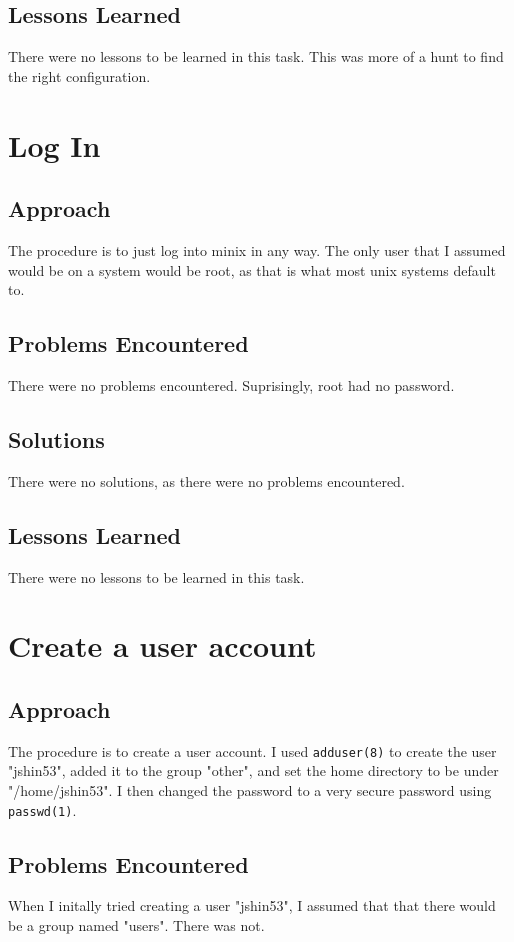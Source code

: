 \documentclass[11pt]{article}
\begin{document}
\subsection{Lessons Learned}
There were no lessons to be learned in this task. This was more of a hunt to find the right configuration.

\section{Log In}
\subsection{Approach}
The procedure is to just log into minix in any way. The only user that I assumed would be on a system would be root, as that is what most unix systems default to.

\subsection{Problems Encountered}
There were no problems encountered. Suprisingly, root had no password.

\subsection{Solutions}
There were no solutions, as there were no problems encountered.

\subsection{Lessons Learned}
There were no lessons to be learned in this task.

\section{Create a user account}
\subsection{Approach}
The procedure is to create a user account. I used {\tt adduser(8)} to create the user "jshin53", added it to the group "other", and set the home directory to be under "/home/jshin53". I then changed the password to a very secure password using {\tt passwd(1)}.

\subsection{Problems Encountered}
When I initally tried creating a user "jshin53", I assumed that that there would be a group named "users". There was not.
\end{document}

